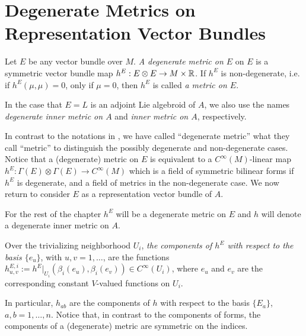 \section{Degenerate Metrics on Representation Vector Bundles}
\label{chIntegrationSectionMetricsRepresentationAssociated}

\begin{definition}\label{definitionDegenerateMetricGeneralEInner}
    Let $E$ be any vector bundle over $M$. \emph{A degenerate metric on $E$} on $E$ is a symmetric vector bundle map $h^E: E \otimes E \to M \times \mathbb{R}$. If $h^E$ is non-degenerate, i.e. if $h^E(\mu, \mu) = 0$, only if $\mu = 0$, then $h^E$ is called \emph{a metric on $E$}.
    
    \noindent In the case that $E = L$ is an adjoint Lie algebroid of $A$, we also use the names \emph{degenerate inner metric on $A$} and \emph{inner metric on $A$}, respectively.
\end{definition}

In contrast to the notations in \cite{Fournel2011, Fournel2013}, we have called ``degenerate metric'' what they call ``metric'' to distinguish the possibly degenerate and non-degenerate cases. Notice that a (degenerate) metric on $E$ is equivalent to a $C^\infty(M)$-linear map $h^E: \Gamma(E) \otimes \Gamma(E) \to C^\infty(M)$ which is a field of symmetric bilinear forms if $h^E$ is degenerate, and a field of metrics in the non-degenerate case. We now return to consider $E$ as a representation vector bundle of $A$.

For the rest of the chapter  $h^E$ will be a degenerate metric on $E$ and $h$ will denote a degenerate inner metric on $A$.

\begin{definition}
    Over the trivializing neighborhood $U_i$, \emph{the components of $h^E$ with respect to the basis $\{e_u\}$}, with $u, v = 1, \dots$, are the functions $h^{E, i}_{u, v}:= h^E|_{U_i}(\beta_i(e_u),\beta_i(e_v)) \in C^\infty(U_i)$, where $e_u$ and $e_v$ are the corresponding constant $V$-valued functions on $U_i$.
\end{definition}

In particular, $h_{ab}$ are the components of $h$ with respect to the basis $\{E_a\}$, $a, b = 1, \dots, n$. Notice that, in contrast to the components of forms, the components of a (degenerate) metric are symmetric on the indices.


